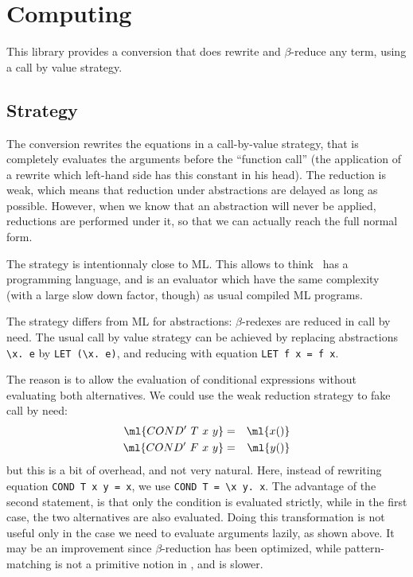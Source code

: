 
\chapter{Computing}

This library provides a conversion that does rewrite and
$\beta$-reduce any term, using a call by value strategy.


\section{Strategy}

The  conversion rewrites the equations in a call-by-value
strategy, that is completely evaluates the arguments before the
``function call'' (the application of a rewrite which left-hand side
has this constant in his head). The reduction is weak, which means
that reduction under abstractions are delayed as long as
possible. However, when we know that an abstraction will never be
applied, reductions are performed under it, so that we can actually
reach the full normal form.

The strategy is intentionnaly close to ML. This allows to think \HOL\
has a programming language, and  is an evaluator which
have the same complexity (with a large slow down factor, though) as
usual compiled ML programs.

The strategy differs from ML for abstractions: $\beta$-redexes are
reduced in call by need. The usual call by value strategy can be
achieved by replacing abstractions \verb#\x. e# by
\verb#LET (\x. e)#, and reducing  with equation
\verb#LET f x = f x#.

The reason is to allow the evaluation of conditional expressions
without evaluating both alternatives. We could use the weak reduction
strategy to fake call by need:
\begin{eqnarray*}
\ml{COND'~T~x~y} & = & \ml{x()} \\
\ml{COND'~F~x~y} & = & \ml{y()}
\end{eqnarray*}
but this is a bit of overhead, and not very natural. Here, instead of
rewriting equation \verb#COND T x y = x#, we use
\verb#COND T = \x y. x#. The advantage of the second statement, is
that only the condition is evaluated strictly, while in the first
case, the two alternatives are also evaluated. Doing this
transformation is not useful only in the case we need to evaluate
arguments lazily, as shown above. It may be an improvement since
$\beta$-reduction has been optimized, while pattern-matching is not a
primitive notion in \HOL, and is slower.



